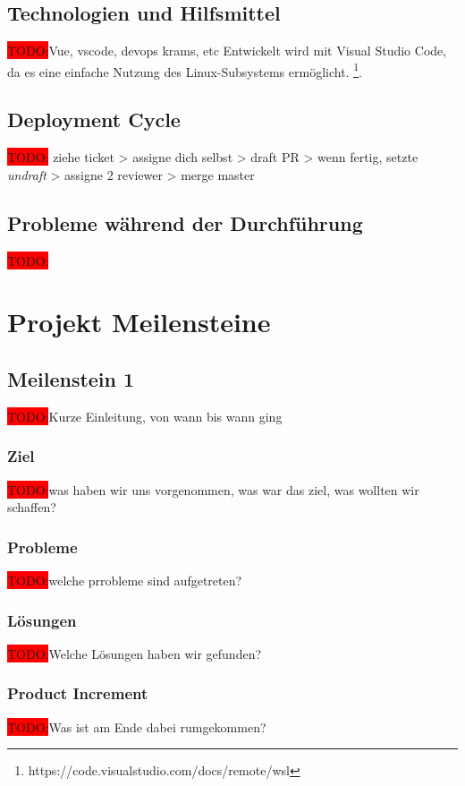 \documentclass[10pt, a4paper]{article}
\begin{document}
\subsection{Technologien und Hilfsmittel}
\colorbox{red}{TODO:}Vue, vscode, devops krams, etc
Entwickelt wird mit Visual Studio Code, da es eine einfache Nutzung des Linux-Subsystems ermöglicht. \footnote{https://code.visualstudio.com/docs/remote/wsl}.

\subsection{Deployment Cycle}
\colorbox{red}{TODO:} ziehe ticket > assigne dich selbst > draft PR > wenn fertig, setzte \textit{undraft} > assigne 2 reviewer > merge master

\subsection{Probleme während der Durchführung}
\colorbox{red}{TODO:}

\section{Projekt Meilensteine}
\subsection{Meilenstein 1}
\colorbox{red}{TODO:}Kurze Einleitung, von wann bis wann ging
\subsubsection{Ziel}
\colorbox{red}{TODO:}was haben wir uns vorgenommen, was war das ziel, was wollten wir schaffen?
\subsubsection{Probleme}
\colorbox{red}{TODO:}welche prrobleme sind aufgetreten?

\subsubsection{Lösungen}
\colorbox{red}{TODO:}Welche Lösungen haben wir gefunden?

\subsubsection{Product Increment}
\colorbox{red}{TODO:}Was ist am Ende dabei rumgekommen?
\end{document}
